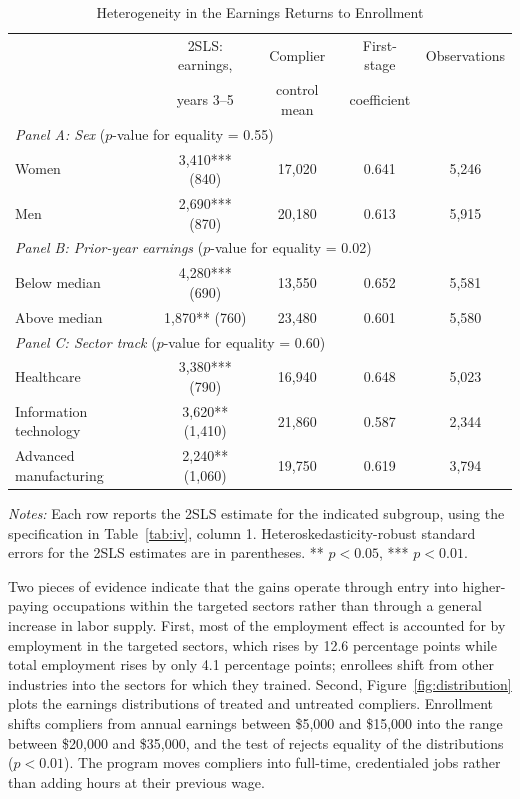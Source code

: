 \documentclass[12pt]{article}
\begin{document}
\begin{table}[htbp]
\centering
\small
\caption{Heterogeneity in the Earnings Returns to Enrollment}
\label{tab:het}
\begin{tabular}{lcccc}
\toprule
 & 2SLS: earnings, & Complier & First-stage & Observations \\
 & years 3--5 & control mean & coefficient & \\
\midrule
\multicolumn{5}{l}{\textit{Panel A: Sex} ($p$-value for equality = 0.55)} \\
Women & 3,410*** (840) & 17,020 & 0.641 & 5,246 \\
Men & 2,690*** (870) & 20,180 & 0.613 & 5,915 \\
\multicolumn{5}{l}{\textit{Panel B: Prior-year earnings} ($p$-value for equality = 0.02)} \\
Below median & 4,280*** (690) & 13,550 & 0.652 & 5,581 \\
Above median & 1,870** (760) & 23,480 & 0.601 & 5,580 \\
\multicolumn{5}{l}{\textit{Panel C: Sector track} ($p$-value for equality = 0.60)} \\
Healthcare & 3,380*** (790) & 16,940 & 0.648 & 5,023 \\
Information technology & 3,620** (1,410) & 21,860 & 0.587 & 2,344 \\
Advanced manufacturing & 2,240** (1,060) & 19,750 & 0.619 & 3,794 \\
\bottomrule
\end{tabular}
\par\medskip
\begin{minipage}{0.92\linewidth}
\footnotesize \textit{Notes:} Each row reports the 2SLS estimate for the indicated subgroup, using the specification in Table~\ref{tab:iv}, column 1. Heteroskedasticity-robust standard errors for the 2SLS estimates are in parentheses. ** $p<0.05$, *** $p<0.01$.
\end{minipage}
\end{table}

Two pieces of evidence indicate that the gains operate through entry into higher-paying occupations within the targeted sectors rather than through a general increase in labor supply. First, most of the employment effect is accounted for by employment in the targeted sectors, which rises by 12.6 percentage points while total employment rises by only 4.1 percentage points; enrollees shift from other industries into the sectors for which they trained. Second, Figure~\ref{fig:distribution} plots the earnings distributions of treated and untreated compliers. Enrollment shifts compliers from annual earnings between \$5,000 and \$15,000 into the range between \$20,000 and \$35,000, and the test of \citet{abadie2002} rejects equality of the distributions ($p < 0.01$). The program moves compliers into full-time, credentialed jobs rather than adding hours at their previous wage.
\end{document}
